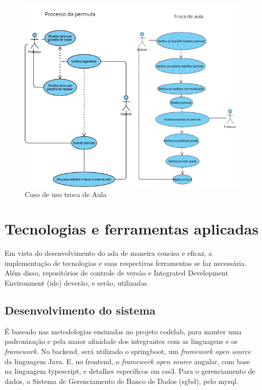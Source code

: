 \begin{figure}[h]
    \centering
    \includegraphics[width=1\textwidth]{anexos/CasosDeUso/CasoDeUso_ProcessoPermutaFULL.png}
    \caption{Caso de uso troca de Aula}
    \label{fig:figura4} 
\end{figure}

\section{Tecnologias e ferramentas aplicadas}

Em vista do desenvolvimento do \ac{ada} de maneira concisa e eficaz, a implementação de tecnologias e suas respectivas ferramentas se faz necessária. Além disso, repositórios de controle de versão e Integrated Development Environment (\ac{ide}) deverão, e serão, utilizadas.

\subsection{Desenvolvimento do sistema}
 É baseado nas metodologias ensinadas no projeto \gls{codelab}, para manter uma padronização e pela maior afinidade dos integrantes com as linguagens e os \textit{\gls{framework}}. No \gls{backend}, será utilizado o \gls{springboot}, um \textit{\gls{framework}} \textit{open source} da linguagem Java. E, no \gls{frontend}, o \textit{\gls{framework}} \textit{open source} \gls{angular}, com base na linguagem \gls{typescript}, e detalhes específicos em \ac{css3}. Para o gerenciamento de dados, o Sistema de Gerenciamento de Banco de Dados (\ac{sgbd}), pelo \gls{mysql}.  
 
